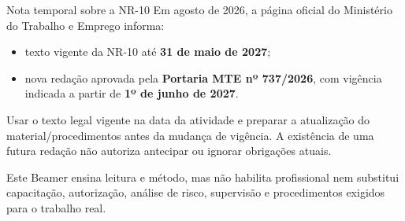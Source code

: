 \begin{frame}{Nota temporal sobre a NR-10}
\small
Em agosto de 2026, a página oficial do Ministério do Trabalho e Emprego informa:
\begin{itemize}
\item texto vigente da NR-10 até \textbf{31 de maio de 2027};
\item nova redação aprovada pela \textbf{Portaria MTE nº 737/2026}, com vigência indicada a partir de \textbf{1º de junho de 2027}.
\end{itemize}
\begin{caixaNorma}[title=Aplicação no curso]
Usar o texto legal vigente na data da atividade e preparar a atualização do material/procedimentos antes da mudança de vigência. A existência de uma futura redação não autoriza antecipar ou ignorar obrigações atuais.
\end{caixaNorma}
\begin{caixaAt}
Este Beamer ensina leitura e método, mas não habilita profissional nem substitui capacitação, autorização, análise de risco, supervisão e procedimentos exigidos para o trabalho real.
\end{caixaAt}
\end{frame}



